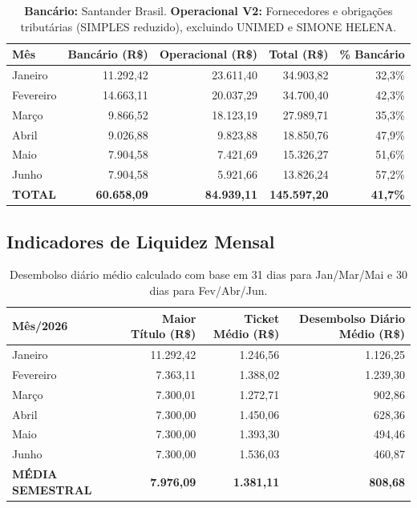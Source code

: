 \documentclass[12pt, a4paper]{article}
\begin{document}
\begin{table}[H]
    \centering
    \renewcommand{\arraystretch}{1.4}
    \begin{tabularx}{\textwidth}{X r r r r}
        \toprule
        \rowcolor{tableHeader} \textbf{Mês} & \textbf{Bancário (R\$)} & \textbf{Operacional (R\$)} & \textbf{Total (R\$)} & \textbf{\% Bancário} \\
        \midrule
        Janeiro & 11.292,42 & 23.611,40 & 34.903,82 & 32,3\% \\
        Fevereiro & 14.663,11 & 20.037,29 & 34.700,40 & 42,3\% \\
        Março & 9.866,52 & 18.123,19 & 27.989,71 & 35,3\% \\
        Abril & 9.026,88 & 9.823,88 & 18.850,76 & 47,9\% \\
        Maio & 7.904,58 & 7.421,69 & 15.326,27 & 51,6\% \\
        Junho & 7.904,58 & 5.921,66 & 13.826,24 & 57,2\% \\
        \midrule
        \rowcolor{lightGray} \textbf{TOTAL} & \textbf{60.658,09} & \textbf{84.939,11} & \textbf{145.597,20} & \textbf{41,7\%} \\
        \bottomrule
    \end{tabularx}
    \caption*{\footnotesize \textbf{Bancário:} Santander Brasil. \textbf{Operacional V2:} Fornecedores e obrigações tributárias (SIMPLES reduzido), excluindo UNIMED e SIMONE HELENA.}
\end{table}

\subsection{Indicadores de Liquidez Mensal}

\begin{table}[H]
    \centering
    \renewcommand{\arraystretch}{1.4}
    \begin{tabularx}{\textwidth}{X r r r}
        \toprule
        \rowcolor{tableHeader} \textbf{Mês/2026} & \textbf{Maior Título (R\$)} & \textbf{Ticket Médio (R\$)} & \textbf{Desembolso Diário Médio (R\$)} \\
        \midrule
        Janeiro & 11.292,42 & 1.246,56 & 1.126,25 \\
        Fevereiro & 7.363,11 & 1.388,02 & 1.239,30 \\
        Março & 7.300,01 & 1.272,71 & 902,86 \\
        Abril & 7.300,00 & 1.450,06 & 628,36 \\
        Maio & 7.300,00 & 1.393,30 & 494,46 \\
        Junho & 7.300,00 & 1.536,03 & 460,87 \\
        \midrule
        \rowcolor{lightGray} \textbf{MÉDIA SEMESTRAL} & \textbf{7.976,09} & \textbf{1.381,11} & \textbf{808,68} \\
        \bottomrule
    \end{tabularx}
    \caption*{\footnotesize Desembolso diário médio calculado com base em 31 dias para Jan/Mar/Mai e 30 dias para Fev/Abr/Jun.}
\end{table}
\end{document}

